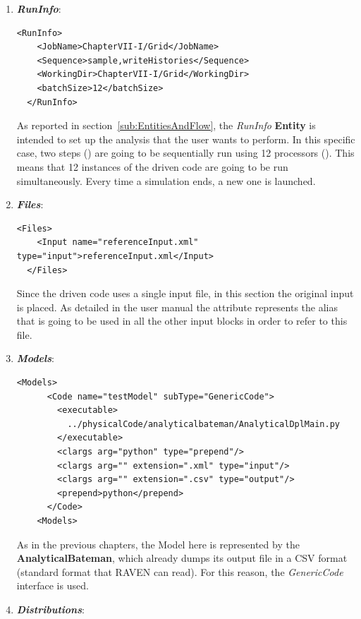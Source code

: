 \begin{enumerate}
   \item \textbf{\textit{RunInfo}}:
\begin{lstlisting}[style=XML,morekeywords={arg,extension,pauseAtEnd,overwrite}]
  <RunInfo>
    <JobName>ChapterVII-I/Grid</JobName>
    <Sequence>sample,writeHistories</Sequence>
    <WorkingDir>ChapterVII-I/Grid</WorkingDir>
    <batchSize>12</batchSize>
  </RunInfo>
\end{lstlisting}   
   As reported in section~\ref{sub:EntitiesAndFlow}, the \textit{RunInfo} \textbf{Entity} is intended to set up the analysis 
   that the user wants to perform. In this specific case, two steps () are going to be sequentially run 
   using 12 processors (). This means that
   12 instances of the driven code are going to be run simultaneously. 
   Every time a simulation ends, a new one is launched.
   \item \textbf{\textit{Files}}:
\begin{lstlisting}[style=XML,morekeywords={arg,extension,pauseAtEnd,overwrite}]
  <Files>
    <Input name="referenceInput.xml" type="input">referenceInput.xml</Input>
  </Files>
\end{lstlisting}
   Since the driven code uses a single input file, in this section the original input is placed. As detailed in the user manual
   the attribute   represents the alias that is going to be used in all the other input blocks in order to refer to this file.
   \item \textbf{\textit{Models}}:
\begin{lstlisting}[style=XML,morekeywords={arg,extension,pauseAtEnd,overwrite}]
   <Models>
      <Code name="testModel" subType="GenericCode">
        <executable>
          ../physicalCode/analyticalbateman/AnalyticalDplMain.py
        </executable>
        <clargs arg="python" type="prepend"/>
        <clargs arg="" extension=".xml" type="input"/>
        <clargs arg="" extension=".csv" type="output"/>
        <prepend>python</prepend>
      </Code>
    <Models>
\end{lstlisting}
 As in the previous chapters, the Model here is represented by the 
 \textbf{AnalyticalBateman}, which already dumps its output file in a 
 CSV format (standard format that RAVEN can read). For this reason,
 the \textit{GenericCode} interface is used.
   \item \textbf{\textit{Distributions}}:
\begin{lstlisting}[style=XML,morekeywords={arg,extension,pauseAtEnd,overwrite}]

\end{lstlisting}
\end{enumerate}
